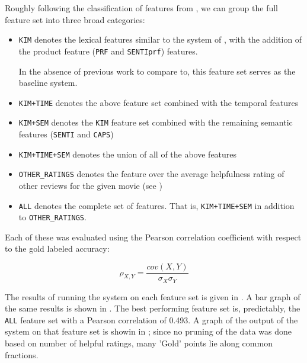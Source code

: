 \documentclass[letter,10pt]{article}
\begin{document}

Roughly following the classification of features from , we
	can group the full feature set into three broad categories:

\begin{itemize}
\item {\tt KIM} denotes the lexical features similar to the system
	of , with the addition of the
	product feature ({\tt PRF} and {\tt SENTIprf}) features.
	
	In the absence of previous work to compare to, this feature set serves
	as the baseline system.
\item {\tt KIM+TIME} denotes the above feature set combined with the
	temporal features
\item {\tt KIM+SEM} denotes the {\tt KIM} feature set combined
	with the remaining semantic features ({\tt SENTI} and {\tt CAPS})
\item {\tt KIM+TIME+SEM} denotes the union of all of the above features
\item {\tt OTHER\_RATINGS} denotes the feature over the average helpfulness
	rating of other reviews for the given movie (see )
\item {\tt ALL} denotes the complete set of features. That is,
	{\tt KIM+TIME+SEM} in addition to {\tt OTHER\_RATINGS}.
\end{itemize}

Each of these was evaluated using the Pearson correlation coefficient
 	with respect to the gold labeled accuracy:

\begin{equation}
	\rho_{X,Y} = \frac{cov(X,Y)}{\sigma_X \sigma_Y}
\end{equation}


The results of running the system on each feature set is given
	in .
A bar graph of the same results is shown in .
The best performing feature set is, predictably, the {\tt ALL} feature set
	with a Pearson correlation of 0.493.
A graph of the output of the system on that feature set is showin
	in ;
	since no pruning of the data was done based on number of helpful
	ratings, many 'Gold' points lie along common fractions.

\end{document}
